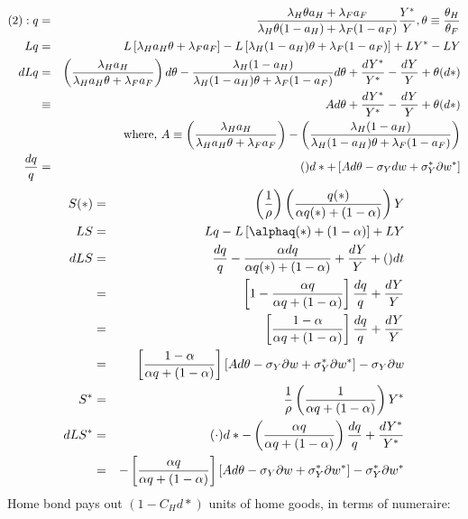 \documentclass[]{article}
\begin{document}
\begin{eqnarray}
(2): q &=& \frac{\lambda_H \theta a_H+\lambda_F a_F}{\lambda_H \theta (1-a_H) + \lambda_F (1-a_F)} \frac{Y^*}{Y}, \theta \equiv \frac{\theta_H}{\theta_F}\notag\\
Lq &=& L\left[\lambda_H a_H \theta + \lambda_F a_F\right] - L\left[\lambda_H (1-a_H) \theta + \lambda_F (1-a_F)\right] + LY^*- LY\notag\\
dLq &=& \left(\frac{\lambda_H a_H}{\lambda_H a_H \theta + \lambda_F a_F}\right)d\theta - \frac{\lambda_H(1-a_H)}{\lambda_H(1-a_H)\theta + \lambda_F (1-a_F)}d\theta + \frac{dY^*}{Y^*} - \frac{dY}{Y} + \theta(d*)\notag\\
&\equiv & Ad\theta + \frac{dY^*}{Y^*}-\frac{dY}{Y} +\theta (d*)\notag\\
&& \mbox{where, } A\equiv \left(\frac{\lambda_H a_H}{\lambda_H a_H \theta + \lambda_F a_F}\right) - \left(\frac{\lambda_H (1-a_H)}{\lambda_H (1-a_H) \theta + \lambda_F (1-a_F)}\right)\notag\\
\frac{dq}{q} &=& ()d* + \left[ Ad\theta - \sigma_Y dw + \sigma_Y^* \partial w^* \right]
\end{eqnarray}
\begin{eqnarray}
S(*) &=& \left(\frac{1}{\rho}\right) \left(\frac{q(*)}{\alpha q(*) + (1-\alpha)}\right)Y \notag\\
LS &=& Lq- L\left[\alphaq(*) + (1-\alpha)\right] + LY \notag\\
dLS &=& \frac{dq}{q} - \frac{\alpha dq}{\alpha q(*) + (1-\alpha)} + \frac{dY}{Y}+()dt\notag\\
&=&\left[1-\frac{\alpha q}{\alpha q + (1-\alpha)}\right] \frac{dq}{q} + \frac{dY}{Y}\notag\\
&=&\left[\frac{1-\alpha}{\alpha q + (1-\alpha)}\right] \frac{dq}{q} + \frac{dY}{Y}\notag\\
&=& \left[\frac{1-\alpha}{\alpha q + (1-\alpha)}\right] \left[A d\theta -\sigma_Y \partial w +\sigma^*_Y \partial w^*\right] - \sigma_Y \partial w\\
S^* &=& \frac{1}{\rho} \left(\frac{1}{\alpha q + (1-\alpha)}\right) Y^*\notag\\
dLS^* &=& (\cdot) d* - \left(\frac{\alpha q}{\alpha q + (1-\alpha)}\right) \frac{dq}{q} + \frac{dY^*}{Y^*}\notag\\
&=& - \left[\frac{\alpha q}{\alpha q + (1-\alpha)}\right] \left[A d\theta -\sigma_Y \partial w +\sigma^*_Y \partial w^*\right] - \sigma^*_Y \partial w^*
\end{eqnarray}
Home bond pays out $(1-C_Hd*)$ units of home goods, in terms of numeraire:
\end{document}
